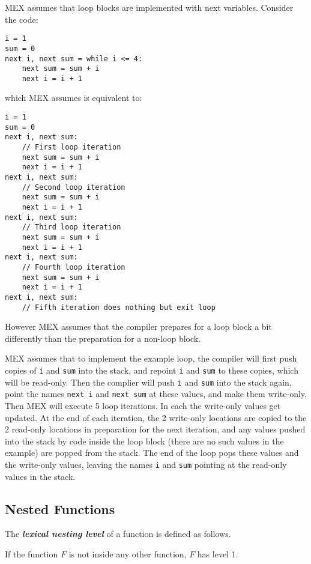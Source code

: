 \documentclass[12pt]{article}
\newcommand{\key}[1]{{\bf \em #1}\index{#1}}
\newenvironment{indpar}[1][0.3in]%
	{\begin{list}{}%
		     {\setlength{\itemsep}{0in}%
		      \setlength{\topsep}{0in}%
		      \setlength{\parsep}{1ex}%
		      \setlength{\labelwidth}{#1}%
		      \setlength{\leftmargin}{#1}%
		      \addtolength{\leftmargin}{\labelsep}}%
	 \item}%
	{\end{list}}
\begin{document}
MEX assumes that loop blocks are implemented with next variables.
Consider the code:
\begin{indpar}\label{EXAMPLE-LOOP}\begin{verbatim}
i = 1
sum = 0
next i, next sum = while i <= 4:
    next sum = sum + i
    next i = i + 1
\end{verbatim}\end{indpar}
which MEX assumes is equivalent to:
\begin{indpar}\begin{verbatim}
i = 1
sum = 0
next i, next sum:
    // First loop iteration
    next sum = sum + i
    next i = i + 1
next i, next sum:
    // Second loop iteration
    next sum = sum + i
    next i = i + 1
next i, next sum:
    // Third loop iteration
    next sum = sum + i
    next i = i + 1
next i, next sum:
    // Fourth loop iteration
    next sum = sum + i
    next i = i + 1
next i, next sum:
    // Fifth iteration does nothing but exit loop
\end{verbatim}\end{indpar}
However MEX assumes that the compiler prepares for a loop
block a bit differently than the preparation for
a non-loop block.

MEX assumes that to implement the example loop, the compiler
will first push copies of {\tt i} and {\tt sum} into
the stack, and repoint {\tt i} and {\tt sum} to these
copies, which will be read-only.
Then the complier will push {\tt i} and {\tt sum}
into the stack again, point the names {\tt next i} and
{\tt next sum} at these values, and make them write-only.
Then MEX will execute 5 loop iterations.  In each the
write-only values get updated.  At the end of each
iteration, the 2 write-only locations are copied to the
2 read-only locations in preparation for the next
iteration, and any values pushed into the stack by
code inside the loop block (there are no such values
in the example) are popped from the stack.  The end of
the loop pops these values and the write-only values,
leaving the names {\tt i} and {\tt sum} pointing at the read-only values
in the stack.

\subsection{Nested Functions}
\label{NESTED-FUNCTIONS}

The \key{lexical nesting level}\label{LEXICAL-NESTING-LEVEL}
of a function is defined as follows.

If the function $F$ is not inside any other function, $F$ has
level 1.
\end{document}
